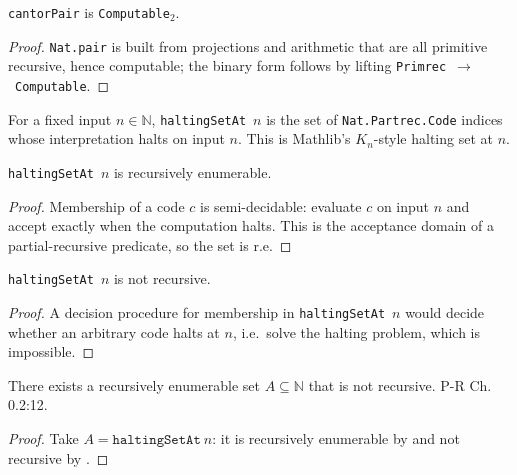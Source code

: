 \begin{lemma}
  \label{lem:cantorPair_computable}
  \leanok
  \texttt{cantorPair} is \texttt{Computable}$_2$.
\end{lemma}
\begin{proof}\leanok
  \texttt{Nat.pair} is built from projections and arithmetic that are all
  primitive recursive, hence computable; the binary form follows by lifting
  \texttt{Primrec}~$\to$~\texttt{Computable}.
\end{proof}

\begin{definition}
  \label{def:haltingSetAt}
  \leanok
  For a fixed input $n \in \mathbb{N}$, \texttt{haltingSetAt}~$n$ is the set of \texttt{Nat.Partrec.Code} indices whose interpretation halts on input $n$. This is Mathlib's $K_n$-style halting set at $n$.
\end{definition}

\begin{lemma}
  \label{lem:haltingSetAt_re}
  \leanok
  \texttt{haltingSetAt}~$n$ is recursively enumerable.
\end{lemma}
\begin{proof}\leanok
  Membership of a code $c$ is semi-decidable: evaluate $c$ on input $n$ and
  accept exactly when the computation halts. This is the acceptance domain of a
  partial-recursive predicate, so the set is r.e.
\end{proof}

\begin{lemma}
  \label{lem:haltingSetAt_not_recursive}
  \leanok
  \texttt{haltingSetAt}~$n$ is not recursive.
\end{lemma}
\begin{proof}\leanok
  A decision procedure for membership in \texttt{haltingSetAt}~$n$ would decide
  whether an arbitrary code halts at $n$, i.e.\ solve the halting problem, which
  is impossible.
\end{proof}

\begin{theorem}[Proposition A]
  \label{thm:propA}
  \leanok
  There exists a recursively enumerable set $A \subseteq \mathbb{N}$ that is not recursive. P-R Ch.\,0.2:12.
\end{theorem}
\begin{proof}\leanok
  Take $A = \texttt{haltingSetAt}~n$: it is recursively enumerable by
   and not recursive by
  .
\end{proof}

